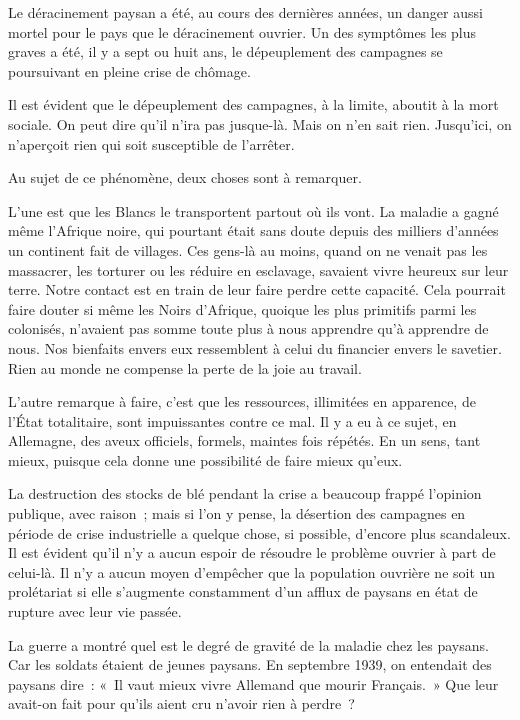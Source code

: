 \documentclass[french,twoside]{book} %
\begin{document}
Le déracinement paysan a été, au cours des dernières années, un danger aussi mortel pour le pays que le déracinement ouvrier. Un des symptômes les plus graves a été, il y a sept ou huit ans, le dépeuplement des campagnes se poursuivant en pleine crise de chômage.\par
\par
Il est évident que le dépeuplement des campagnes, à la limite, aboutit à la mort sociale. On peut dire qu'il n'ira pas jusque-là. Mais on n'en sait rien. Jusqu'ici, on n'aperçoit rien qui soit susceptible de l'arrêter.\par
Au sujet de ce phénomène, deux choses sont à remarquer.\par
L'une est que les Blancs le transportent partout où ils vont. La maladie a gagné même l'Afrique noire, qui pourtant était sans doute depuis des milliers d'années un continent fait de villages. Ces gens-là au moins, quand on ne venait pas les massacrer, les torturer ou les réduire en esclavage, savaient vivre heureux sur leur terre. Notre contact est en train de leur faire perdre cette capacité. Cela pourrait faire douter si même les Noirs d'Afrique, quoique les plus primitifs parmi les colonisés, n'avaient pas somme toute plus à nous apprendre qu'à apprendre de nous. Nos bienfaits envers eux ressemblent à celui du financier envers le savetier. Rien au monde ne compense la perte de la joie au travail.\par
L'autre remarque à faire, c'est que les ressources, illimitées en apparence, de l'État totalitaire, sont impuissantes contre ce mal. Il y a eu à ce sujet, en Allemagne, des aveux officiels, formels, maintes fois répétés. En un sens, tant mieux, puisque cela donne une possibilité de faire mieux qu'eux.\par
La destruction des stocks de blé pendant la crise a beaucoup frappé l'opinion publique, avec raison ; mais si l'on y pense, la désertion des campagnes en période de crise industrielle a quelque chose, si possible, d'encore plus scandaleux. Il est évident qu'il n'y a aucun espoir de résoudre le problème ouvrier à part de celui-là. Il n'y a aucun moyen d'empêcher que la population ouvrière ne soit un prolétariat si elle s'augmente constamment d'un afflux de paysans en état de rupture avec leur vie passée.\par
La guerre a montré quel est le degré de gravité de la maladie chez les paysans. Car les soldats étaient de jeunes paysans. En septembre 1939, on entendait des paysans dire : « Il vaut mieux vivre Allemand que mourir Français. » Que leur avait-on fait pour qu'ils aient cru n'avoir rien à perdre ?\par
\end{document}
